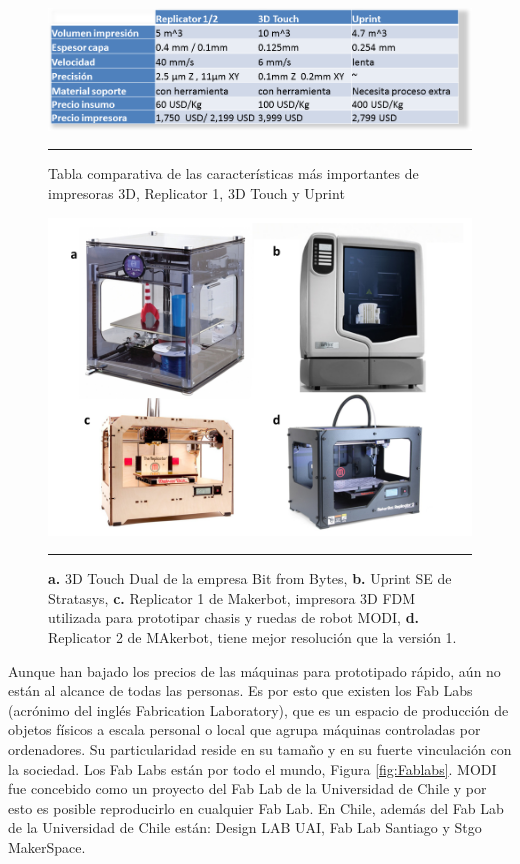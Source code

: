 \begin{figure}[htbp]
	\centering
		\includegraphics[width=\textwidth]{./Figures/tabla_impresoras.png}
		\rule{35em}{0.5pt}
	\caption[Tabla comparativa de impresoras 3D]{Tabla comparativa de las características más importantes de impresoras 3D, Replicator 1, 3D Touch y Uprint}
	\label{fig:TablaImpresoras}
\end{figure}


\begin{figure}[htbp]
	\centering
		\includegraphics[width=\textwidth]{./Figures/impresoras.png}
		\rule{35em}{0.5pt}
	\caption[Impresoras 3D]{\textbf{a.} 3D Touch Dual de la empresa Bit from Bytes, \textbf{b.} Uprint SE de Stratasys, \textbf{c.} Replicator 1 de Makerbot, impresora 3D FDM utilizada para prototipar chasis y ruedas de robot MODI, \textbf{d.} Replicator 2 de MAkerbot, tiene mejor resolución que la versión 1.}
	\label{fig:impresoras}
\end{figure}	


Aunque han bajado los precios de las máquinas para prototipado rápido, aún no están al alcance de todas las personas. Es por esto que existen los Fab Labs (acrónimo del inglés Fabrication Laboratory), que es un espacio de producción de objetos físicos a escala personal o local que agrupa máquinas controladas por ordenadores. Su particularidad reside en su tamaño y en su fuerte vinculación con la sociedad. Los Fab Labs están por todo el mundo, Figura \ref{fig:Fablabs}. MODI fue concebido como un proyecto del Fab Lab de la Universidad de Chile y por esto es posible reproducirlo en cualquier Fab Lab. En Chile, además del Fab Lab de la Universidad de Chile están: Design LAB UAI, Fab Lab Santiago y Stgo MakerSpace. 

